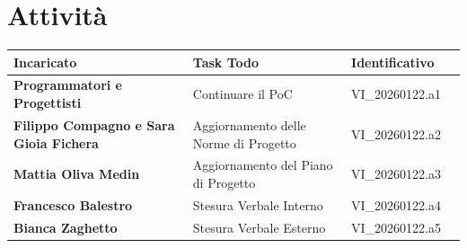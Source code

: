 \documentclass[a4paper,12pt]{article}
\begin{document}
    \section{Attività} {
        \begin{tabularx}{\textwidth}{|l|X|l|l|}
            \hline
            \textbf{Incaricato} & \textbf{Task Todo} & \textbf{Identificativo} \\
            \hline
            \textbf{Programmatori e Progettisti} & Continuare il PoC & VI\_20260122.a1 \\
            \hline
            \textbf{Filippo Compagno e Sara Gioia Fichera} & Aggiornamento delle Norme di Progetto & VI\_20260122.a2 \\
            \hline
            \textbf{Mattia Oliva Medin} & Aggiornamento del Piano di Progetto & VI\_20260122.a3 \\
            \hline
            \textbf{Francesco Balestro} & Stesura Verbale Interno & VI\_20260122.a4 \\
            \hline
            \textbf{Bianca Zaghetto} & Stesura Verbale Esterno & VI\_20260122.a5 \\
            \hline
        \end{tabularx}
    }
\end{document}
